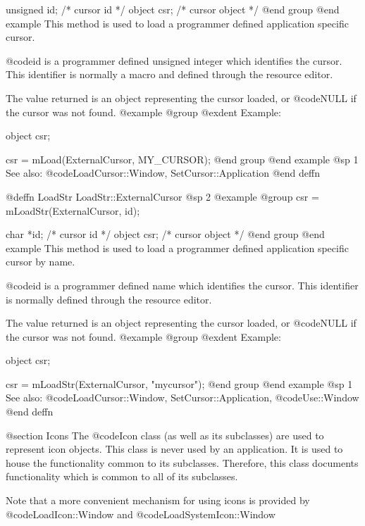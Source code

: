 unsigned id;    /*  cursor id      */
object   csr;   /*  cursor object  */
@end group
@end example
This method is used to load a programmer defined application specific
cursor.

@code{id} is a programmer defined unsigned integer which identifies
the cursor.  This identifier is normally a macro and defined through the
resource editor.  

The value returned is an object representing the cursor loaded, or
@code{NULL} if the cursor was not found.
@example
@group
@exdent Example:

object  csr;

csr = mLoad(ExternalCursor, MY_CURSOR);
@end group
@end example
@sp 1
See also:  @code{LoadCursor::Window, SetCursor::Application}
@end deffn











@deffn {LoadStr} LoadStr::ExternalCursor
@sp 2
@example
@group
csr = mLoadStr(ExternalCursor, id);

char    *id;    /*  cursor id      */
object   csr;   /*  cursor object  */
@end group
@end example
This method is used to load a programmer defined application specific
cursor by name.

@code{id} is a programmer defined name which identifies the cursor.
This identifier is normally defined through the resource editor.

The value returned is an object representing the cursor loaded, or
@code{NULL} if the cursor was not found.
@example
@group
@exdent Example:

object  csr;

csr = mLoadStr(ExternalCursor, "mycursor");
@end group
@end example
@sp 1
See also:  @code{LoadCursor::Window, SetCursor::Application,}
        @code{Use::Window}
@end deffn




@section Icons
The @code{Icon} class (as well as its subclasses) are used to represent
icon objects.  This class is never used by an application.  It is used
to house the functionality common to its subclasses.  Therefore, this
class documents functionality which is common to all of its subclasses.

Note that a more convenient mechanism for using icons is provided by
@code{LoadIcon::Window} and @code{LoadSystemIcon::Window}









